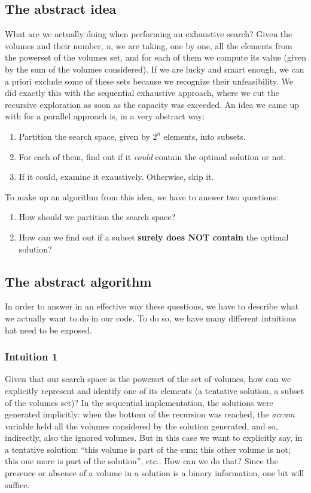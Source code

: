 \documentclass[12pt]{extarticle}
\begin{document}
\subsection{The abstract idea}
What are we actually doing when performing an exhaustive search? Given the volumes and their number, \emph{n}, we are taking, one by one, all the elements from the powerset of the volumes set, and for each of them we compute its value (given by the sum of the volumes considered). If we are lucky and smart enough, we can a priori exclude some of these sets because we recognize their unfeasibility. We did exactly this with the sequential exhaustive approach, where we cut the recursive exploration as soon as the capacity was exceeded.\newline
An idea we came up with for a parallel approach is, in a very abstract way:
\begin{enumerate}
    \item Partition the search space, given by $2^{n}$ elements, into subsets.
    \item For each of them, find out if it \emph{could} contain the optimal solution or not.
    \item If it could, examine it exaustively. Otherwise, skip it.
\end{enumerate}
To make up an algorithm from this idea, we have to answer two questions:
\begin{enumerate}
    \item How should we partition the search space?
    \item How can we find out if a subset \textbf{surely does NOT contain} the optimal solution?
\end{enumerate}
\subsection{The abstract algorithm}
In order to answer in an effective way these questions, we have to describe what we actually want to do in our code. To do so, we have many different intuitions hat need to be exposed.
\subsubsection{Intuition 1}
Given that our search space is the powerset of the set of volumes, how can we explicitly represent and identify one of its elements (a tentative solution, a subset of the volumes set)? In the sequential implementation, the solutions were generated implicitly: when the bottom of the recursion was reached, the \emph{accum} variable held all the volumes considered by the solution generated, and so, indirectly, also the ignored volumes. But in this case we want to explicitly say, in a tentative solution: ``this volume is part of the sum; this other volume is not; this one more is part of the solution'', etc.. How can we do that?\newline
Since the presence or absence of a volume in a solution is a binary information, one bit will suffice.
\end{document}
